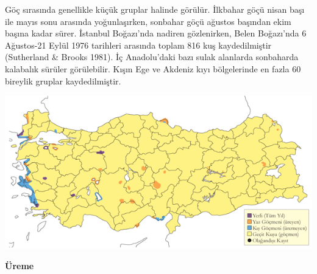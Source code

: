 \documentclass[
  letterpaper,
  DIV=11,
  numbers=noendperiod]{scrreprt}
\begin{document}
Göç sırasında genellikle küçük gruplar halinde görülür. İlkbahar göçü
nisan başı ile mayıs sonu arasında yoğunlaşırken, sonbahar göçü ağustos
başından ekim başına kadar sürer. İstanbul Boğazı'nda nadiren
gözlenirken, Belen Boğazı'nda 6 Ağustos-21 Eylül 1976 tarihleri arasında
toplam 816 kuş kaydedilmiştir (Sutherland \& Brooks 1981). İç
Anadolu'daki bazı sulak alanlarda sonbaharda kalabalık sürüler
görülebilir. Kışın Ege ve Akdeniz kıyı bölgelerinde en fazla 60 bireylik
gruplar kaydedilmiştir.

\includegraphics{images/harita_Page_063.png}

\textbf{Üreme}
\end{document}
